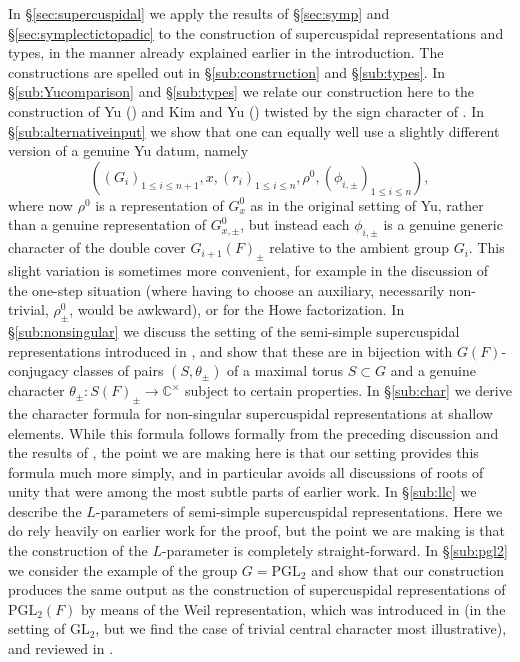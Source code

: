 \documentclass{article}
\def\tx#1{\textrm{#1}}
\def\C{\mathbb{C}}
\theoremstyle{definition}
\numberwithin{equation}{subsection}
\renewcommand{\-}{\hyp{}}
\begin{document}
In \S\ref{sec:supercuspidal} we apply the results of \S\ref{sec:symp} and \S\ref{sec:symplectictopadic} to the construction of supercuspidal representations and types, in the manner already explained earlier in the introduction. The constructions are spelled out in \S\ref{sub:construction} and \S\ref{sub:types}. In \S\ref{sub:Yucomparison} and \S\ref{sub:types} we relate our construction here to the construction of Yu (\cite{Yu01}) and Kim and Yu (\cite{KimYu}) twisted by the sign character of \cite{FKS23}. In \S\ref{sub:alternativeinput} we show that one can equally well use a slightly different version of a genuine Yu datum, namely 
\[((G_i)_{1\leq i\leq n+1},x,(r_i)_{1\leq i\leq n},\rho^0,(\phi_{i,\pm})_{1\leq i\leq n}), \]
where now $\rho^0$ is a representation of $G^0_x$ as in the original setting of Yu, rather than a genuine representation of $G^0_{x,\pm}$, but instead each $\phi_{i,\pm}$ is a genuine generic character of the double cover $G_{i+1}(F)_\pm$ relative to the ambient group $G_i$. This slight variation is sometimes more convenient, for example in the discussion of the one-step situation (where having to choose an auxiliary, necessarily non-trivial, $\rho^0_\pm$, would be awkward), or for the Howe factorization. In \S\ref{sub:nonsingular} we discuss the setting of the semi-simple supercuspidal representations introduced in \cite{KalSLP}, and show that these are in bijection with $G(F)$-conjugacy classes of pairs $(S,\theta_\pm)$ of a maximal torus $S \subset G$ and a genuine character $\theta_\pm : S(F)_\pm \to \C^\times$ subject to certain properties. In \S\ref{sub:char} we derive the character formula for non-singular supercuspidal representations at shallow elements. While this formula follows formally from the preceding discussion and the results of \cite{KalRSP}, the point we are making here is that our setting provides this formula much more simply, and in particular avoids all discussions of roots of unity that were among the most subtle parts of earlier work. In \S\ref{sub:llc} we describe the $L$-parameters of semi-simple supercuspidal representations. Here we do rely heavily on earlier work for the proof, but the point we are making is that the construction of the $L$-parameter is completely straight-forward. In \S\ref{sub:pgl2} we consider the example of the group $G=\tx{PGL}_2$ and show that our construction produces the same output as the construction of supercuspidal representations of $\tx{PGL}_2(F)$ by means of the Weil representation, which was introduced in \cite{JL79} (in the setting of $\tx{GL}_2$, but we find the case of trivial central character most illustrative), and reviewed in \cite[\S39]{BH06}.
\end{document}
